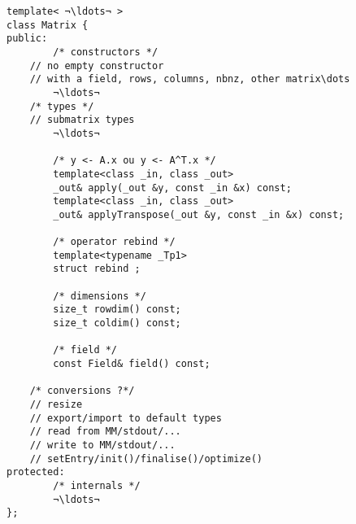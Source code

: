 {
\begin{lstlisting}
template< ¬\ldots¬ >
class Matrix {
public:
        /* constructors */
	// no empty constructor
	// with a field, rows, columns, nbnz, other matrix\dots
        ¬\ldots¬
	/* types */
	// submatrix types
        ¬\ldots¬

        /* y <- A.x ou y <- A^T.x */
        template<class _in, class _out>
        _out& apply(_out &y, const _in &x) const;
        template<class _in, class _out>
        _out& applyTranspose(_out &y, const _in &x) const;

        /* operator rebind */
        template<typename _Tp1>
        struct rebind ;

        /* dimensions */
        size_t rowdim() const;
        size_t coldim() const;

        /* field */
        const Field& field() const;

	/* conversions ?*/
	// resize
	// export/import to default types
	// read from MM/stdout/...
	// write to MM/stdout/...
	// setEntry/init()/finalise()/optimize()
protected:
        /* internals */
        ¬\ldots¬
};
\end{lstlisting}
}
